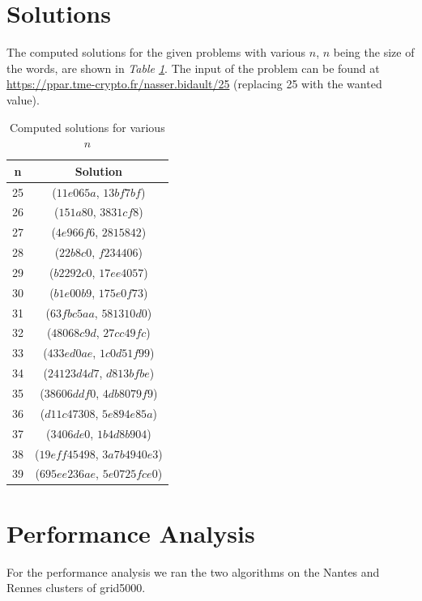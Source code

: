 \documentclass[12pt]{article}
\begin{document}
\section{Solutions}
The computed solutions for the given problems with various \(n\), \(n\) being the size of the words, are shown in
\textit{Table \ref{tab:solutions}}.
The input of the problem can be found at \url{https://ppar.tme-crypto.fr/nasser.bidault/25} (replacing 25 with the wanted value).
\begin{table}
    \centering
    \begin{tabular}{|c|c|}
        \hline
        \textbf{n} & \textbf{Solution}                \\
        \hline
        25         & (\(11e065a\), \(13bf7bf\))       \\
        26         & (\(151a80\), \(3831cf8\))        \\
        27         & (\(4e966f6\), \(2815842\))       \\
        28         & (\(22b8c0\), \(f234406\))        \\
        29         & (\(b2292c0\), \(17ee4057\))      \\
        30         & (\(b1e00b9\), \(175e0f73\))      \\
        31         & (\(63fbc5aa\), \(581310d0\))     \\
        32         & (\(48068c9d\), \(27cc49fc\))     \\
        33         & (\(433ed0ae\), \(1c0d51f99\))    \\
        34         & (\(24123d4d7\), \(d813bfbe\))    \\
        35         & (\(38606ddf0\), \(4db8079f9\))   \\
        36         & (\(d11c47308\), \(5e894e85a\))   \\
        37         & (\(3406de0\), \(1b4d8b904\))     \\
        38         & (\(19eff45498\), \(3a7b4940e3\)) \\
        39         & (\(695ee236ae\), \(5e0725fce0\)) \\
        \hline
    \end{tabular}
    \caption{Computed solutions for various \(n\)}
    \label{tab:solutions}
\end{table}

\section{Performance Analysis}
For the performance analysis we ran the two algorithms on the Nantes and Rennes clusters of grid5000.
\end{document}

